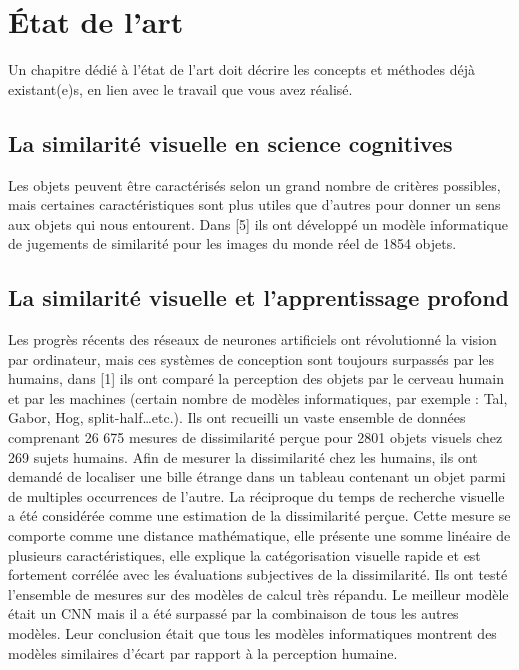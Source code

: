 \chapter{État de l'art}

Un chapitre dédié à l'état de l'art doit décrire les concepts et méthodes déjà existant(e)s, en lien avec le travail que vous avez réalisé.

\section{La similarité visuelle en science cognitives}

Les objets peuvent être caractérisés selon un grand nombre de critères possibles, mais certaines caractéristiques sont plus utiles que d’autres pour donner un sens aux objets qui nous entourent. Dans [5] ils ont développé un modèle informatique de jugements de similarité pour les images du monde réel de 1854 objets.

\section{La similarité visuelle et l’apprentissage profond}

Les progrès récents des réseaux de neurones artificiels ont révolutionné la vision par ordinateur, mais ces systèmes de conception sont toujours surpassés par les humains, dans [1] ils ont comparé la perception des objets par le cerveau humain et par les machines (certain nombre de modèles informatiques, par exemple : Tal, Gabor, Hog, split-half…etc.).  Ils ont recueilli un vaste ensemble de données comprenant 26 675 mesures de dissimilarité perçue pour 2801 objets visuels chez 269 sujets humains.  Afin de mesurer la dissimilarité chez les humains, ils ont demandé de localiser une bille étrange dans un tableau contenant un objet parmi de multiples occurrences de l’autre. La réciproque du temps de recherche visuelle a été considérée comme une estimation de la dissimilarité perçue. Cette mesure se comporte comme une distance mathématique, elle présente une somme linéaire de plusieurs caractéristiques, elle explique la catégorisation visuelle rapide et est fortement corrélée avec les évaluations subjectives de la dissimilarité. Ils ont testé l’ensemble de mesures sur des modèles de calcul très répandu. Le meilleur modèle était un CNN mais il a été surpassé par la combinaison de tous les autres modèles. Leur conclusion était que tous les modèles informatiques montrent des modèles similaires d’écart par rapport à la perception humaine.
 

